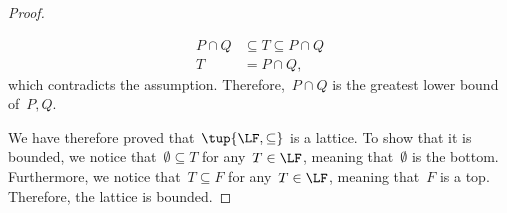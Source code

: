 \begin{proof}
\begin{compactitem}
\begin{equation}
\begin{aligned}
        P\cap Q &\subseteq T\subseteq P\cap Q\\
        T&=P\cap Q,
      \end{aligned}
    \end{equation}
    which contradicts the assumption. Therefore,~$P\cap Q$ is the greatest lower bound of~$P,Q$.
  \end{compactitem}
  We have therefore proved that~$\tup{\LF,\subseteq}$ is a lattice. To show that it is bounded, we notice that~$\emptyset \subseteq T$ for any~$T\in \LF$, meaning that~$\emptyset$ is the bottom. Furthermore, we notice that~$T\subseteq F$ for any~$T\in \LF$, meaning that~$F$ is a top. Therefore, the lattice is bounded.
\end{proof}
